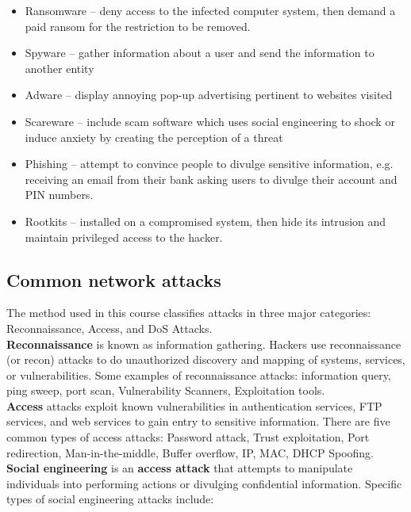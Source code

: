 \begin{itemize}
\item Ransomware -- deny access to the infected computer system, then demand a paid ransom for the restriction to be removed.
\item Spyware -- gather information about a user and send the information to another entity
\item Adware -- display annoying pop-up advertising pertinent to websites visited
\item Scareware -- include scam software which uses social engineering to shock or induce anxiety by creating the perception of a threat
\item Phishing -- attempt to convince people to divulge sensitive information, e.g. receiving an email from their bank asking users to divulge their account and PIN numbers.
\item Rootkits -- installed on a compromised system, then hide its intrusion and maintain privileged access to the hacker.
\end{itemize}

\subsection{Common network attacks}

The method used in this course classifies attacks in three major categories: Reconnaissance, Access, and DoS Attacks.\\

\textbf{Reconnaissance} is known as information gathering. Hackers use reconnaissance (or recon) attacks to do unauthorized discovery and mapping of systems, services, or vulnerabilities. Some examples of reconnaissance attacks:  information query, ping sweep,  port scan,  Vulnerability Scanners,  Exploitation tools.\\

\textbf{Access} attacks exploit known vulnerabilities in authentication services, FTP services, and web services to gain entry to  sensitive information. There are five common types of access attacks: Password attack, Trust exploitation, Port redirection, Man-in-the-middle, Buffer overflow, IP, MAC, DHCP Spoofing.\\

\textbf{Social engineering} is an \textbf{access attack} that attempts to manipulate individuals into performing actions or divulging confidential information. Specific types of social engineering attacks include:

